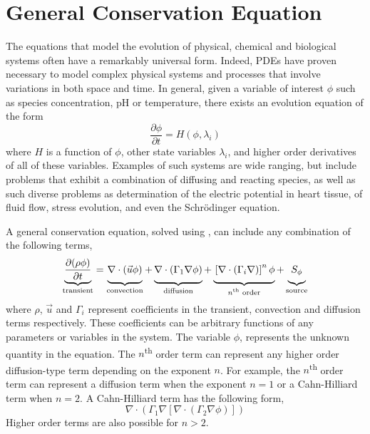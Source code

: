 \section{General Conservation Equation}
\label{sec:GeneralConservationEquation}

The equations that model the evolution of physical, chemical and
biological systems often have a remarkably universal form.  Indeed,
PDEs have proven necessary to model complex physical systems and
processes that involve variations in both space and time.  In general,
given a variable of interest \( \phi \) such as species concentration,
pH or temperature, there exists an evolution equation of the form
\begin{equation}
  \frac{\partial \phi}{\partial t} = H(\phi, \lambda_i)
  \label{eqn:general-equation}
\end{equation}
where \( H \) is a function of \(\phi\), other state variables
\(\lambda_i\), and higher order derivatives of all of these variables.
Examples of such systems are wide ranging, but include problems that
exhibit a combination of diffusing and reacting species, as well as
such diverse problems as determination of the electric potential in
heart tissue, of fluid flow, stress evolution, and even the
Schr\"odinger equation.

A general conservation equation, solved using \FiPy{}, can include any
combination of the following terms,
\begin{equation}                        
  \underbrace{
  \frac{\partial (\rho \phi)}{\partial t}
  }_{\text{transient}}
=
\underbrace{
  \vphantom{\frac{\partial (\rho \phi)}{\partial t}}
  \nabla \cdot \left( \vec{u} \phi \right)
}_{\text{convection}}
+
\underbrace{
  \vphantom{\frac{\partial (\rho \phi)}{\partial t}}
  \nabla \cdot \left( \Gamma_1 \nabla \phi \right) 
}_{\text{diffusion}}
+
\underbrace{
  \vphantom{\frac{\partial (\rho \phi)}{\partial t}}
  \left[ \nabla \cdot \left( \Gamma_i \nabla \right) \right]^n \phi
}_{\text{$n$\textsuperscript{th} order}}
+
\underbrace{
  \vphantom{\frac{\partial (\rho \phi)}{\partial t}}
  S_{\phi}
}_{\text{source}}
\label{eqn:num:gen}
\end{equation}
where $\rho$, $\vec{u}$ and $\Gamma_i$ represent coefficients in the
transient, convection and diffusion terms respectively.  These
coefficients can be arbitrary functions of any parameters or variables
in the system.  The variable $\phi$, represents the unknown quantity
in the equation.  The $n$\textsuperscript{th} order term can represent
any higher order diffusion-type term depending on the exponent $n$.
For example, the $n$\textsuperscript{th} order term can represent a
diffusion term when the exponent $n = 1$ or a Cahn-Hilliard term when
$n = 2$.  A Cahn-Hilliard term has the following form,
\begin{equation}
  \nabla \cdot \left( \Gamma_1 \nabla \left[ 
  \nabla \cdot \left( \Gamma_2 \nabla \phi \right) \right] \right)
  \label{eqn:cahn-hilliard}
\end{equation}
Higher order terms are also possible for $n > 2$.



